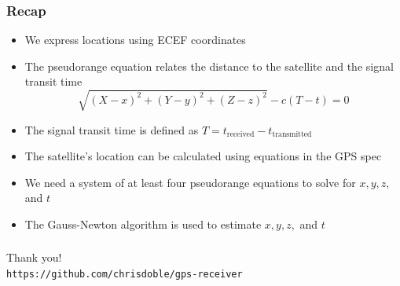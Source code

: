 \documentclass[aspectratio=169, xcolor=table]{beamer}
\begin{document}
\begin{frame}
  \frametitle{Recap}

  \begin{itemize}
    \item<2-> We express locations using ECEF coordinates

    \item<3-> The pseudorange equation relates the distance to the satellite and the signal transit time \[\sqrt{(X - x)^2 + (Y - y)^2 + (Z - z)^2} - c (T - t) = 0\]
    
    \item<4-> The signal transit time is defined as $T = t_\text{received} - t_\text{transmitted}$
    
    \item<5-> The satellite's location can be calculated using equations in the GPS spec
    
    \item<6-> We need a system of at least four pseudorange equations to solve for $x, y, z,$ and $t$
    
    \item<7-> The Gauss-Newton algorithm is used to estimate $x, y, z,$ and $t$
  \end{itemize}
\end{frame}

\begin{frame}
  \frametitle{}

  \centering
  \vspace{1cm}
  {\Huge Thank you!} \\
  \vspace{1cm}
  \texttt{https://github.com/chrisdoble/gps-receiver}
\end{frame}
\end{document}
